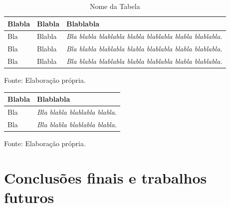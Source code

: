 \documentclass[tcc,capa]{texifsap}
\begin{document}
\begin{table}[htbp]
\caption{Nome da Tabela}\label{tabela}
\centering\begin{tabular}{p{4cm}p{5cm}p{6cm}}
\hline
Blabla & Blabla & Blablabla\\
\hline
{\small Bla} & {\small Blabla} & {\small\em Bla blabla blablabla blabla
  blablabla blabla blablabla.}\\
{\small Bla} & {\small Blabla} & {\small\em Bla blabla blablabla blabla
  blablabla blabla blablabla.}\\
{\small Bla} & {\small Blabla} & {\small\em Bla blabla blablabla blabla
  blablabla blabla blablabla.}\\
\hline
\end{tabular}
\begin{flushleft}
{\small Fonte: Elaboração própria.}
\end{flushleft}
\end{table}

\begin{quadro}[htbp]
\caption{Nome do Quadro}\label{quadro1}
\centering\begin{tabular}{|p{4cm}|p{5cm}|}
\hline
Blabla & Blablabla\\
\hline
{\small Bla} & {\small\em Bla blabla blablabla blabla.}\\
\hline
{\small Bla} & {\small\em Bla blabla blablabla blabla.}\\
\hline
\end{tabular}
\begin{flushleft}
{\small Fonte: Elaboração própria.}
\end{flushleft}
\end{quadro}

\chapter{Conclusões finais e trabalhos futuros}
\end{document}
